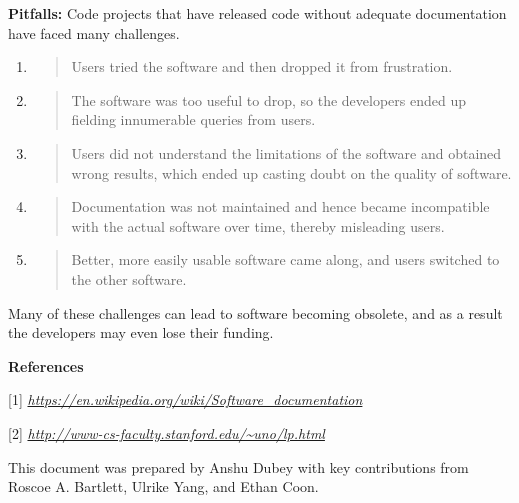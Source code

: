 \documentclass[]{article}
\begin{document}
\textbf{Pitfalls:} Code projects that
have released code without adequate documentation have faced many
challenges.

\begin{enumerate}
\def\labelenumi{(\arabic{enumi})}
\item
  \begin{quote}
  Users tried the software and then dropped it from frustration.
  \end{quote}
\item
  \begin{quote}
  The software was too useful to drop, so the developers ended up
  fielding innumerable queries from users.
  \end{quote}
\item
  \begin{quote}
  Users did not understand the limitations of the software and obtained
  wrong results, which ended up casting doubt on the quality of
  software.
  \end{quote}
\item
  \begin{quote}
  Documentation was not maintained and hence became incompatible with
  the actual software over time, thereby misleading users.
  \end{quote}
\item
  \begin{quote}
  Better, more easily usable software came along, and users switched to
  the other software.
  \end{quote}
\end{enumerate}

Many of these challenges can lead to software becoming obsolete, and as
a result the developers may even lose their funding.

\textbf{References}

{[}1{]}
\href{https://en.wikipedia.org/wiki/Software_documentation}{\emph{https://en.wikipedia.org/wiki/Software\_documentation}}

{[}2{]}
\href{http://www-cs-faculty.stanford.edu/~uno/lp.html}{\emph{http://www-cs-faculty.stanford.edu/\textasciitilde{}uno/lp.html}}

This document was prepared by Anshu Dubey with key contributions from
Roscoe A. Bartlett, Ulrike Yang, and Ethan Coon.
\end{document}
